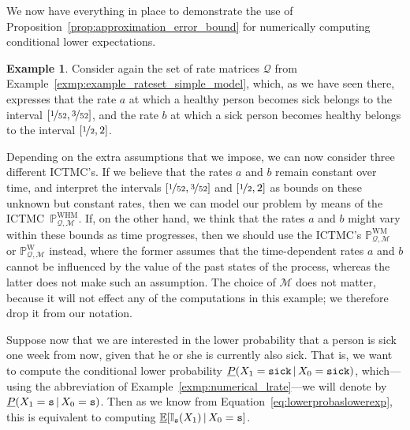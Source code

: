 \documentclass[10pt,a4paper]{paper}
\theoremstyle{definition}
\newtheorem{exmp}{Example}%
\newcommand{\states}{\mathcal{X}}
\newcommand{\gambles}{\mathcal{L}}
\newcommand{\gamblesX}{\gambles(\states)}
\newcommand{\ind}[1]{\mathbb{I}_{#1}}
\newcommand{\rateset}{\mathcal{Q}}
\newcommand{\ictmc}{{ICTMC}}
\begin{document}
We now have everything in place to demonstrate the use of Proposition~\ref{prop:approximation_error_bound} for numerically computing conditional lower expectations. %

\begin{exmp}\label{exmp:single_time_numerical}
Consider again the set of rate matrices $\rateset$ from Example~\ref{exmp:example_rateset_simple_model}, which, as we have seen there, expresses that the rate $a$ at which a healthy person becomes sick belongs to the interval $[\nicefrac{1}{52},\nicefrac{3}{52}]$, and the rate $b$ at which a sick person becomes healthy belongs to the interval $[\nicefrac{1}{2},2]$.

Depending on the extra assumptions that we impose, we can now consider three different \ictmc's. If we believe that the rates $a$ and $b$ remain constant over time, and interpret the intervals $[\nicefrac{1}{52},\nicefrac{3}{52}]$ and $[\nicefrac{1}{2},2]$ as bounds on these unknown but constant rates, then we can model our problem by means of the \ictmc~$\mathbb{P}_{\rateset,\mathcal{M}}^{\mathrm{WHM}}$. If, on the other hand, we think that the rates $a$ and $b$ might vary within these bounds as time progresses, then we should use the \ictmc's $\mathbb{P}_{\rateset,\mathcal{M}}^{\mathrm{WM}}$ or $\mathbb{P}_{\rateset,\mathcal{M}}^{\mathrm{W}}$ instead, where the former assumes that the time-dependent rates $a$ and $b$ cannot be influenced by the value of the past states of the process, whereas the latter does not make such an assumption. The choice of $\mathcal{M}$ does not matter, because it will not effect any of the computations in this example; we therefore drop it from our notation.

Suppose now that we are interested in the lower probability that a person is sick one week from now, given that he or she is currently also sick. That is, we want to compute the conditional lower probability $\underline{P}(X_1 = \text{{\tt sick}}\,\vert\,X_0=\text{{\tt sick}})$, which---using the abbreviation of Example~\ref{exmp:numerical_lrate}---we will denote by $\underline{P}(X_1 = \text{{\tt s}}\,\vert\,X_0=\text{{\tt s}})$. Then as we know from Equation~\eqref{eq:lowerprobaslowerexp}, this is equivalent to computing $\underline{\mathbb{E}}[\ind{\text{{\tt s}}}(X_1)\,\vert\,X_0=\text{{\tt s}}]$.


\end{exmp}
\end{document}
